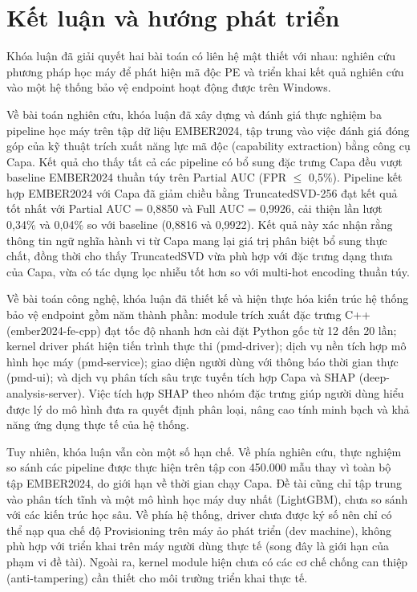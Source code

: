 \chapter*{Kết luận và hướng phát triển}

Khóa luận đã giải quyết hai bài toán có liên hệ mật thiết với nhau:
nghiên cứu phương pháp học máy để phát hiện mã độc PE và triển khai
kết quả nghiên cứu vào một hệ thống bảo vệ endpoint hoạt động được
trên Windows.

Về bài toán nghiên cứu, khóa luận đã xây dựng và đánh giá thực nghiệm
ba pipeline học máy trên tập dữ liệu EMBER2024, tập trung vào việc
đánh giá đóng góp của kỹ thuật trích xuất năng lực mã độc (capability
extraction) bằng công cụ Capa. Kết quả cho thấy tất cả các pipeline
có bổ sung đặc trưng Capa đều vượt baseline EMBER2024 thuần túy trên
Partial AUC (FPR $\leq$ 0,5\%). Pipeline kết hợp EMBER2024 với Capa
đã giảm chiều bằng TruncatedSVD-256 đạt kết quả tốt nhất với Partial
AUC = 0,8850 và Full AUC = 0,9926, cải thiện lần lượt 0,34\% và
0,04\% so với baseline (0,8816 và 0,9922). Kết quả này xác nhận rằng
thông tin ngữ nghĩa hành vi từ Capa mang lại giá trị phân biệt bổ
sung thực chất, đồng thời cho thấy TruncatedSVD vừa phù hợp với đặc
trưng dạng thưa của Capa, vừa có tác dụng lọc nhiễu tốt hơn so với
multi-hot encoding thuần túy.

Về bài toán công nghệ, khóa luận đã thiết kế và hiện thực hóa kiến
trúc hệ thống bảo vệ endpoint gồm năm thành phần: module trích xuất
đặc trưng C++ (ember2024-fe-cpp) đạt tốc độ nhanh hơn cài đặt Python
gốc từ 12 đến 20 lần; kernel driver phát hiện tiến trình thực thi
(pmd-driver); dịch vụ nền tích hợp mô hình học máy (pmd-service); giao
diện người dùng với thông báo thời gian thực (pmd-ui); và dịch vụ phân
tích sâu trực tuyến tích hợp Capa và SHAP (deep-analysis-server). Việc
tích hợp SHAP theo nhóm đặc trưng giúp người dùng hiểu được lý do mô
hình đưa ra quyết định phân loại, nâng cao tính minh bạch và khả năng
ứng dụng thực tế của hệ thống.

Tuy nhiên, khóa luận vẫn còn một số hạn chế. Về
phía nghiên cứu, thực nghiệm so sánh các pipeline được thực hiện trên
tập con 450.000 mẫu thay vì toàn bộ tập EMBER2024, do giới hạn về
thời gian chạy Capa. Đề tài cũng chỉ tập trung vào phân tích tĩnh và
một mô hình học máy duy nhất (LightGBM), chưa so sánh với các kiến
trúc học sâu. Về phía hệ thống, driver chưa được ký số nên chỉ có thể
nạp qua chế độ Provisioning trên máy ảo phát triển (dev machine), không phù hợp với
triển khai trên máy người dùng thực tế (song đây là giới hạn của
phạm vi đề tài). Ngoài ra, kernel module hiện chưa có các cơ chế chống
can thiệp (anti-tampering) cần thiết cho môi trường triển khai thực tế.

